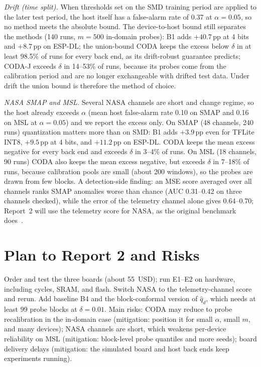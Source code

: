 \documentclass[conference]{IEEEtran}
\begin{document}
\emph{Drift (time split).} When thresholds set on the SMD training period are applied to the later test period, the host itself has a false-alarm rate of 0.37 at $\alpha=0.05$, so no method meets the absolute bound. The device-to-host bound still separates the methods (140 runs, $m=500$ in-domain probes): B1 adds $+40.7$\,pp at 4 bits and $+8.7$\,pp on ESP-DL; the union-bound CODA keeps the excess below $\delta$ in at least 98.5\% of runs for every back end, as its drift-robust guarantee predicts; CODA-J exceeds $\delta$ in 14--53\% of runs, because its probes come from the calibration period and are no longer exchangeable with drifted test data. Under drift the union bound is therefore the method of choice.

\emph{NASA SMAP and MSL.} Several NASA channels are short and change regime, so the host already exceeds $\alpha$ (mean host false-alarm rate 0.10 on SMAP and 0.16 on MSL at $\alpha=0.05$) and we report the excess only. On SMAP (48 channels, 240 runs) quantization matters more than on SMD: B1 adds $+3.9$\,pp even for TFLite INT8, $+9.5$\,pp at 4 bits, and $+11.2$\,pp on ESP-DL. CODA keeps the mean excess negative for every back end and exceeds $\delta$ in 3--4\% of runs. On MSL (18 channels, 90 runs) CODA also keeps the mean excess negative, but exceeds $\delta$ in 7--18\% of runs, because calibration pools are small (about 200 windows), so the probes are drawn from few blocks. A detection-side finding: an MSE score averaged over all channels ranks SMAP anomalies worse than chance (AUC 0.31--0.42 on three channels checked), while the error of the telemetry channel alone gives 0.64--0.70; Report~2 will use the telemetry score for NASA, as the original benchmark does~\cite{hundman2018}.

\section{Plan to Report 2 and Risks}
Order and test the three boards (about 55~USD); run E1--E2 on hardware, including cycles, SRAM, and flash. Switch NASA to the telemetry-channel score and rerun. Add baseline B4 and the block-conformal version of $\hat q_d$, which needs at least 99 probe blocks at $\delta=0.01$. Main risks: CODA may reduce to probe recalibration in the in-domain case (mitigation: position it for small $\alpha$, small $m$, and many devices); NASA channels are short, which weakens per-device reliability on MSL (mitigation: block-level probe quantiles and more seeds); board delivery delays (mitigation: the simulated board and host back ends keep experiments running).
\end{document}
